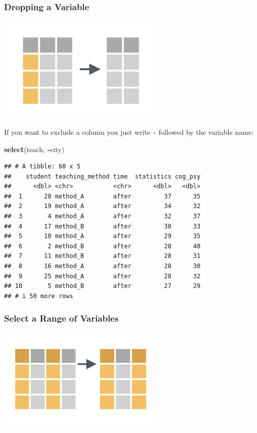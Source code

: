 \documentclass[
]{scrartcl}
\newenvironment{Shaded}{\begin{snugshade}}{\end{snugshade}}
\newcommand{\FunctionTok}[1]{\textcolor[rgb]{0.13,0.29,0.53}{\textbf{#1}}}
\newcommand{\NormalTok}[1]{#1}
\newcommand{\SpecialCharTok}[1]{\textcolor[rgb]{0.81,0.36,0.00}{\textbf{#1}}}
\begin{document}
\subsubsection{Dropping a Variable}\label{dropping-a-variable}

\begin{center}\includegraphics[width=300px]{images/dplyr-select-drop} \end{center}

If you want to exclude a column you just write \texttt{-} followed by the variable name:

\begin{Shaded}
\begin{Highlighting}[]
\FunctionTok{select}\NormalTok{(teach, }\SpecialCharTok{{-}}\NormalTok{city)}
\end{Highlighting}
\end{Shaded}

\begin{verbatim}
## # A tibble: 60 x 5
##    student teaching_method time  statistics cog_psy
##      <dbl> <chr>           <chr>      <dbl>   <dbl>
##  1      28 method_A        after         37      35
##  2      19 method_A        after         34      32
##  3       4 method_A        after         32      37
##  4      17 method_B        after         30      33
##  5      10 method_A        after         29      35
##  6       2 method_B        after         28      40
##  7      11 method_B        after         28      31
##  8      16 method_A        after         28      30
##  9      25 method_A        after         28      32
## 10       5 method_B        after         27      29
## # i 50 more rows
\end{verbatim}

\subsubsection{Select a Range of Variables}\label{select-a-range-of-variables}

\begin{center}\includegraphics[width=300px]{images/dplyr-select-range} \end{center}
\end{document}
